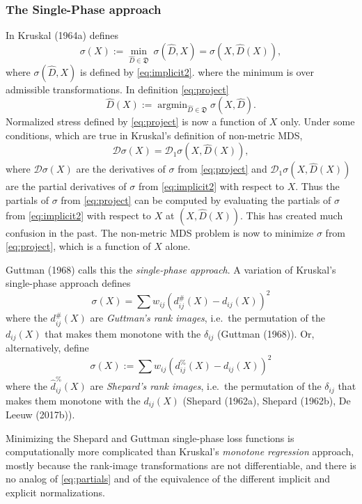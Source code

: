 \documentclass[
  12pt,
]{article}
\begin{document}
\subsubsection{The Single-Phase approach}\label{the-single-phase-approach}

In Kruskal (1964a) defines
\begin{equation}
\sigma(X):=\min_{\hat D\in\mathfrak{D}}\ \sigma(\hat D,X)=\sigma(X,\hat D(X)),
\label{eq:project}
\end{equation}
where \(\sigma(\hat D,X)\) is defined by \eqref{eq:implicit2}.
where the minimum is over admissible transformations. In definition
\eqref{eq:project}
\begin{equation}
\hat D(X):=\mathop{\text{argmin}}_{\hat D\in\mathfrak{D}}\sigma(X, \hat D).
\label{eq:optscal}
\end{equation}
Normalized stress defined by \eqref{eq:project} is now a function of \(X\) only. Under some
conditions, which are true in Kruskal's definition of non-metric MDS,
\begin{equation}
\mathcal{D}\sigma(X)=\mathcal{D}_1\sigma(X,\hat D(X)),
\label{eq:partials}
\end{equation}
where \(\mathcal{D}\sigma(X)\) are the derivatives of \(\sigma\) from \eqref{eq:project} and \(\mathcal{D}_1\sigma(X,\hat D(X))\) are the partial derivatives of \(\sigma\) from \eqref{eq:implicit2} with respect to \(X\). Thus the partials of \(\sigma\) from \eqref{eq:project} can be computed by evaluating the partials of \(\sigma\) from \eqref{eq:implicit2} with respect to \(X\) at \((X,\hat D(X))\). This has created much confusion in the past. The non-metric MDS problem is now to minimize \(\sigma\) from \eqref{eq:project}, which is a function of \(X\) alone.

Guttman (1968) calls this the \emph{single-phase approach}. A variation of
Kruskal's single-phase approach defines
\[
\sigma(X)=\sum   w_{ij}(d_{ij}^\#(X)-d_{ij}(X))^2
\]
where the \(d_{ij}^\#(X)\) are \emph{Guttman's rank images}, i.e.~the
permutation of the \(d_{ij}(X)\) that makes them monotone with the
\(\delta_{ij}\) (Guttman (1968)). Or, alternatively, define
\[
\sigma(X):=\sum   w_{ij}(d_{ij}^\%(X)-d_{ij}(X))^2
\]
where the \(\hat d_{ij}^\%(X)\) are \emph{Shepard's rank images}, i.e.~the
permutation of the \(\delta_{ij}\) that makes them monotone with the
\(d_{ij}(X)\) (Shepard (1962a), Shepard (1962b), De Leeuw (2017b)).

Minimizing the Shepard and Guttman single-phase loss functions is
computationally more complicated than Kruskal's \emph{monotone regression}
approach, mostly because the rank-image transformations are not differentiable,
and there is no analog of \eqref{eq:partials} and of the equivalence of
the different implicit and explicit normalizations.
\end{document}
